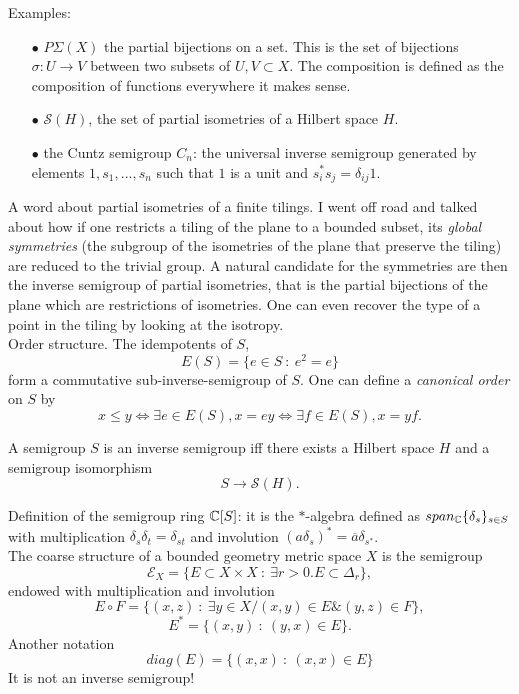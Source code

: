 Examples:
\begin{itemize}
\item[$\bullet$] $P\Sigma(X)$ the partial bijections on a set. This is the set of bijections $\sigma : U \rightarrow V$ between two subsets of $U,V \subset X$. The composition is defined as the composition of functions everywhere it makes sense.  
\item[$\bullet$] $\mathcal S(H)$, the set of partial isometries of a Hilbert space $H$.
\item[$\bullet$] the Cuntz semigroup $C_n$: the universal inverse semigroup generated by elements $1,s_1,..., s_n$ such that $1$ is a unit and $s^*_is_j = \delta_{ij}1$.
\end{itemize}

A word about partial isometries of a finite tilings. I went off road and talked about how if one restricts a tiling of the plane to a bounded subset, its \textit{global symmetries} (the subgroup of the isometries of the plane that preserve the tiling) are reduced to the trivial group. A natural candidate for the symmetries are then the inverse semigroup of partial isometries, that is the partial bijections of the plane which are restrictions of isometries. One can even recover the type of a point in the tiling by looking at the isotropy.\\  

Order structure. The idempotents of $S$, 
\[E(S)= \{e \in S \ : \ e^2 = e\}\]
form a commutative sub-inverse-semigroup of $S$. One can define a \textit{canonical order} on $S$ by 
\[x\leq y \iff \exists e \in E(S) , x= ey \iff \exists f \in E(S) , x= yf.\]
 
\begin{prop} A semigroup $S$ is an inverse semigroup iff there exists a Hilbert space $H$ and a semigroup isomorphism
\[S \rightarrow \mathcal S(H).\]
\end{prop}

Definition of the semigroup ring $\mathbb C[S]$: it is the $*$-algebra defined as $span_{\mathbb C} \{\delta_s\}_{s\in S}$ with multiplication $\delta_s \delta_t = \delta_{st}$ and involution $(a\delta_s)^* = \overline a \delta_{s^*}$.\\

The coarse structure of a bounded geometry metric space $X$ is the semigroup 
\[\mathcal E_X =\{E\subset X\times X \ : \ \exists r>0. E\subset \Delta_r\},\]
endowed with multiplication and involution
\[E\circ F=\{(x,z) \ : \ \exists y \in X / (x,y)\in E \& (y,z)\in F \},\]
\[ E^*=\{(x,y) \ : \ (y,x)\in E \}.\]
Another notation
\[diag(E) =\{(x,x) \ : \ (x,x)\in E  \}\]
It is not an inverse semigroup!\\

